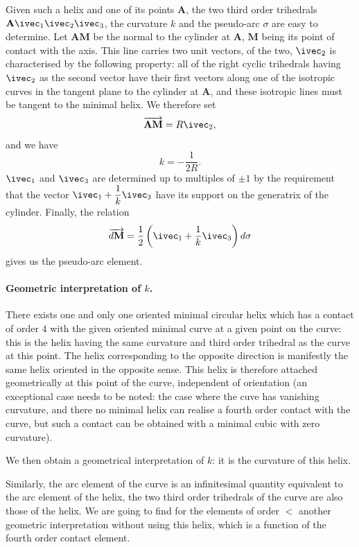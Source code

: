 Given such a helix and one of its points $\mathbf{A}$, the two third order trihedrals $\mathbf{A}\ivec_{1}\ivec_{2}\ivec_{3}$, the curvature $k$ and the pseudo-arc $\sigma$ are easy to determine. Let $\mathbf{AM}$ be the normal to the cylinder at $\mathbf{A}$, $\mathbf{M}$ being its point of contact with the axis. This line carries two unit vectors, of the two, $\ivec_{2}$ is characterised by the following property: all of the right cyclic trihedrals having $\ivec_{2}$ as the second vector have their first vectors along one of the isotropic curves in the tangent plane to the cylinder at $\mathbf{A}$, and these isotropic lines must be tangent to the minimal helix. We therefore set
\[
\overrightarrow{\mathbf{AM}}=R\ivec_{2},
\]
and we have
\[
k=-\frac{1}{2R}.
\]
$\ivec_{1}$ and $\ivec_{3}$ are determined up to multiples of $\pm 1$ by the requirement that the vector $\ivec_{1}+\dfrac{1}{k}\ivec_{3}$ have its support on the generatrix of the cylinder.
Finally, the relation
\[
\overrightarrow{d\mathbf{M}}=\frac{1}{2}\left(\ivec_{1}+\frac{1}{k}\ivec_{3}\right)d\sigma
\]
gives us the pseudo-arc element.


\paragraph{Geometric interpretation of $k$.}
\label{sec:38}
There exists one and only one oriented minimal circular helix which has a contact of order $4$ with the given oriented minimal curve at a given point on the curve: this is the helix having the same curvature and third order trihedral as the curve at this point. The helix corresponding to the opposite direction is manifestly the same helix oriented in the opposite sense. This helix is therefore attached geometrically at this point of the curve, independent of orientation (an exceptional case needs to be noted: the case where the cuve has vanishing curvature, and there no minimal helix can realise a fourth order contact with the curve, but such a contact can be obtained with a minimal cubic with zero curvature).

We then obtain a geometrical interpretation of $k$: it is the curvature of this helix.

Similarly, the arc element of the curve is an infinitesimal quantity equivalent to the arc element of the helix, the two third order trihedrals of the curve are also those of the helix. We are going to find for the elements of order $<$ another geometric interpretation without using this helix, which is a function of the fourth order contact element.

